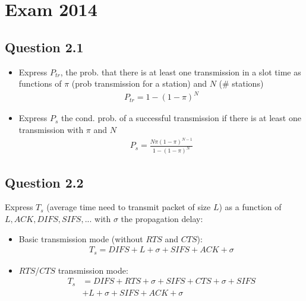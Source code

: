 \section*{Exam 2014}
\subsection*{Question 2.1}
\begin{itemize}
	\item Express $P_{tr}$, the prob. that there is at least one transmission in a slot time as functions of $\pi$ (prob transmission for a station) and $N$ (\# stations)
	\begin{align*}
		P_{tr} = 1 - (1 - \pi)^N
	\end{align*}
	\item Express $P_s$ the cond. prob. of a successful transmission if there is at least one transmission with $\pi$ and $N$
	\begin{align*}
		P_s = \frac{N \pi (1 - \pi)^{N-1}}{1 - (1 - \pi)^N}
	\end{align*}
\end{itemize}

\subsection*{Question 2.2}
Express $T_s$ (average time need to transmit packet of size $L$) as a function of $L, ACK, DIFS, SIFS,...$ with $\sigma$ the propagation delay:
\begin{itemize}
	\item Basic transmission mode (without $RTS$ and $CTS$):
	\begin{align*}
		T_s = DIFS + L + \sigma + SIFS + ACK + \sigma
	\end{align*}
	\item $RTS$/$CTS$ transmission mode:
	\begin{align*}
		T_s &= DIFS + RTS + \sigma + SIFS + CTS + \sigma + SIFS \\
		&+ L + \sigma + SIFS + ACK + \sigma
	\end{align*}
\end{itemize}

